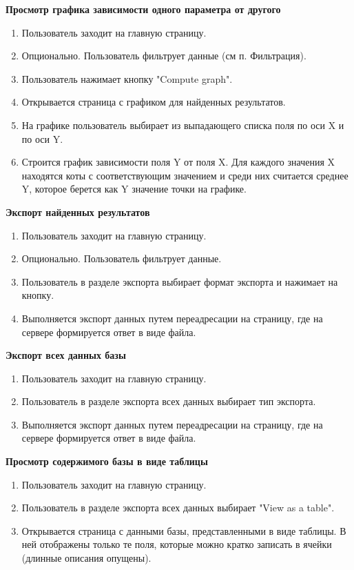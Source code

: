 \textbf{Просмотр графика зависимости одного параметра от другого}
\begin{enumerate}
    \item Пользователь заходит на главную страницу.
    \item Опционально. Пользователь фильтрует данные (см п. Фильтрация).
    \item Пользователь нажимает кнопку "Compute graph".
    \item Открывается страница с графиком для найденных результатов.
    \item На графике пользователь выбирает из выпадающего списка поля по оси X и по оси Y.
    \item Строится график зависимости поля Y от поля X. Для каждого значения X находятся коты с соответствующим значением и среди них считается среднее Y, которое берется как Y значение точки на графике.
\end{enumerate}

\textbf{Экспорт найденных результатов}
\begin{enumerate}
    \item Пользователь заходит на главную страницу.
    \item Опционально. Пользователь фильтрует данные.
    \item Пользователь в разделе экспорта выбирает формат экспорта и нажимает на кнопку.
    \item Выполняется экспорт данных путем переадресации на страницу, где на сервере формируется ответ в виде файла.
\end{enumerate}

\textbf{Экспорт всех данных базы}
\begin{enumerate}
    \item Пользователь заходит на главную страницу.
    \item Пользователь в разделе экспорта всех данных выбирает тип экспорта.
    \item Выполняется экспорт данных путем переадресации на страницу, где на сервере формируется ответ в виде файла.
\end{enumerate}

\textbf{Просмотр содержимого базы в виде таблицы}
\begin{enumerate}
    \item Пользователь заходит на главную страницу.
    \item Пользователь в разделе экспорта всех данных выбирает "View as a table".
    \item Открывается страница с данными базы, представленными в виде таблицы. В ней отображены только те поля, которые можно кратко записать в ячейки (длинные описания опущены).
\end{enumerate}

